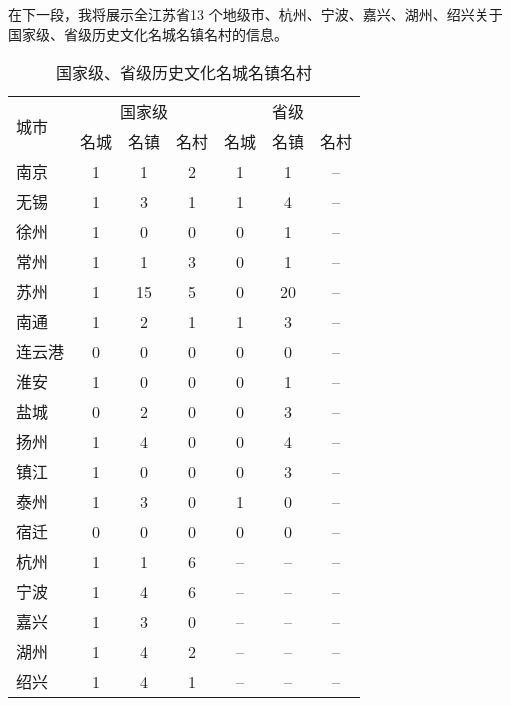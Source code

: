 \documentclass[H:\workspace\担保人财务信息2\杭州大运河\HangZhouText.tex]{subfiles}
\begin{document}
\newpage 
在下一段，我将展示全江苏省13 个地级市、杭州、宁波、嘉兴、湖州、绍兴关于
国家级、省级历史文化名城名镇名村的信息。
\begin{table}[H]
    \xiaowuhao   
    \centering 
    \setlength{\tabcolsep}{1.2em} %
    {\renewcommand{\arraystretch}{0.5} %
    \begin{tabular}{@{}l|cccccc@{}}
    \toprule 
    \multirow[c]{2}[3]{*}{城市} & \multicolumn{3}{c}{国家级} & \multicolumn{3}{c}{省级} \\ 
    \cmidrule(lr){2-4} \cmidrule(lr){5-7}
    & 名城 & 名镇 & 名村 & 名城 & 名镇 & 名村 \\
    \midrule 
    南京 & 1 & 1 & 2 & 1 & 1 & \cellcolor{orange} -- \\
    \midrule 
    无锡 & 1 & 3 & 1 & 1 & 4 & \cellcolor{orange} -- \\
    \midrule 
    徐州 & 1 & 0 & 0 & 0 & 1 & \cellcolor{orange} -- \\
    \midrule 
    常州 & 1 & 1 & 3 & 0 &  1 & \cellcolor{orange} -- \\
    \midrule 
    苏州 & 1 & 15 & 5 & 0 & 20 & \cellcolor{orange} -- \\
    \midrule 
    南通 & 1 & 2 & 1 & 1 & 3 & \cellcolor{orange} -- \\
    \midrule 
    连云港 & 0 & 0 & 0 & 0 & 0 & \cellcolor{orange} -- \\
    \midrule 
    淮安 & 1 & 0 & 0 & 0 & 1 & \cellcolor{orange} -- \\
    \midrule 
    盐城 & 0 & 2 & 0 & 0 & 3 & \cellcolor{orange} -- \\
    \midrule 
    扬州 & 1 & 4 & 0 & 0 & 4 & \cellcolor{orange} -- \\ 
    \midrule 
    镇江 & 1 & 0 & 0 & 0 & 3 & \cellcolor{orange} -- \\
    \midrule 
    泰州 & 1 & 3 & 0 & 1 & 0 & \cellcolor{orange} -- \\ 
    \midrule 
    宿迁 & 0 & 0 & 0 & 0 & 0 & \cellcolor{orange} -- \\ 
    \midrule 
    \rowcolor{orange}
    杭州 & 1 & 1 & 6 & -- & -- & -- \\
    \midrule 
    \rowcolor{orange}
    宁波 & 1 & 4 & 6 & -- & -- & -- \\
    \midrule 
    \rowcolor{orange}
    嘉兴 & 1 & 3 & 0 & -- & -- & -- \\
    \midrule 
    \rowcolor{orange}
    湖州 & 1 & 4 & 2 & -- & -- & -- \\
    \midrule 
    \rowcolor{orange}
    绍兴 & 1 & 4 & 1 & -- & -- & -- \\
    \bottomrule 
    \end{tabular}
    }
    \caption{国家级、省级历史文化名城名镇名村}
\end{table}
\end{document}
